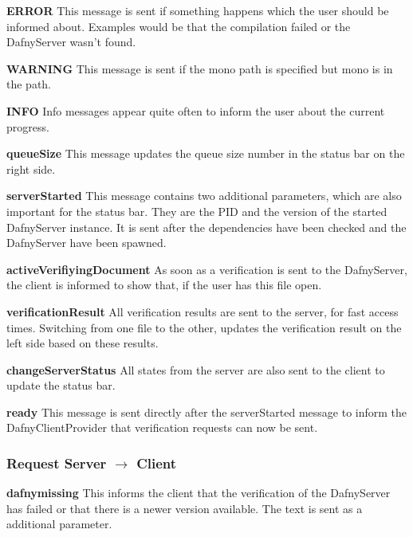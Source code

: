 \textbf{ERROR}
This message is sent if something happens which the user should be informed about. Examples would be that the compilation failed or the DafnyServer wasn't found. \newline

\textbf{WARNING}
This message is sent if the mono path is specified but mono is in the path. \newline

\textbf{INFO}
Info messages appear quite often to inform the user about the current progress. \newline

\textbf{queueSize}
This message updates the queue size number in the status bar on the right side. \newline

\textbf{serverStarted}
This message contains two additional parameters, which are also important for the status bar. They are the PID and the version of the started DafnyServer instance. It is sent after the dependencies have been checked and the DafnyServer have been spawned. \newline

\textbf{activeVerifiyingDocument}
As soon as a verification is sent to the DafnyServer, the client is informed to show that, if the user has this file open. \newline

\textbf{verificationResult}
All verification results are sent to the server, for fast access times. Switching from one file to the other, updates the verification result on the left side based on these results. \newline

\textbf{changeServerStatus}
All states from the server are also sent to the client to update the status bar. \newline

\textbf{ready}
This message is sent directly after the serverStarted message to inform the DafnyClientProvider that verification requests can now be sent. \newline

\subsubsection{Request Server $\longrightarrow$ Client}

\textbf{dafnymissing}
This informs the client that the verification of the DafnyServer has failed or that there is a newer version available. The text is sent as a additional parameter.  \newline

